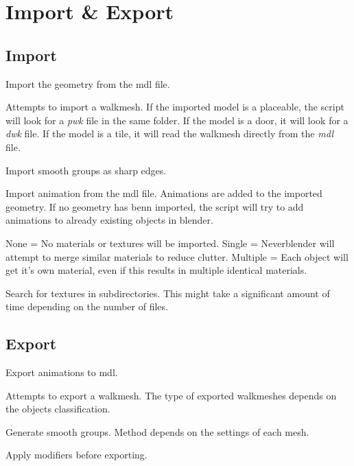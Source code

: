\section{Import \& Export}

\subsection{Import}

\begin{description}[leftmargin=13em,style=nextline]
    \item[Import Geometry] Import the geometry from the mdl file.
    \item[Import Walkmesh] Attempts to import a walkmesh. If the imported model is a placeable, the script will look for a {\textit{pwk}} file in the same folder. If the model is a door, it will look for a {\textit{dwk}} file. If the model is a tile, it will read the walkmesh directly from the {\textit{mdl}} file.
    \item[Import Smooth Groups] Import smooth groups as sharp edges.
    \item[Import Animations] Import animation from the mdl file. Animations are added to the imported geometry. If no geometry has benn imported, the script will try to add animations to already existing objects in blender.
    \item[Materials] None = No materials or textures will be imported. Single = Neverblender will attempt to merge similar materials to reduce clutter. Multiple = Each object will get it's own material, even if this results in multiple identical materials.
    \item[Image Search] Search for textures in subdirectories. This might take a significant amount of time depending on the number of files.
\end{description}

\subsection{Export}

\begin{description}[leftmargin=12em,style=nextline]
    \item[Export Animations] Export animations to mdl.
    \item[Export Walkmesh] Attempts to export a walkmesh. The type of exported walkmeshes depends on the objects classification.
    \item[Export Smooth Groups] Generate smooth groups. Method depends on the settings of each mesh.
    \item[Apply Modifiers] Apply modifiers before exporting.
\end{description}
